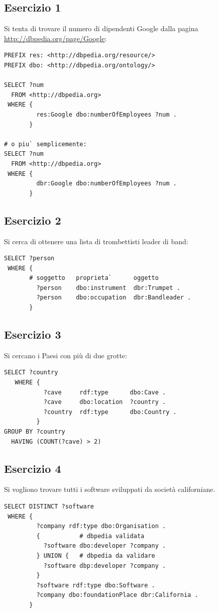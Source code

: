 \documentclass[11pt]{article}
\begin{document}
\subsection*{Esercizio 1}
Si tenta di trovare il numero di dipendenti Google dalla pagina \url{http://dbpedia.org/page/Google}:
\begin{lstlisting}[language=sparql]
PREFIX res: <http://dbpedia.org/resource/>
PREFIX dbo: <http://dbpedia.org/ontology/>

SELECT ?num
  FROM <http://dbpedia.org>
 WHERE {
         res:Google dbo:numberOfEmployees ?num .
       }

# o piu` semplicemente:
SELECT ?num
  FROM <http://dbpedia.org>
 WHERE {
         dbr:Google dbo:numberOfEmployees ?num .
       }
\end{lstlisting}

\subsection*{Esercizio 2}
Si cerca di ottenere una lista di trombettisti leader di band:
\begin{lstlisting}[language=sparql]
SELECT ?person
 WHERE {
       # soggetto   proprieta`      oggetto
         ?person    dbo:instrument  dbr:Trumpet .
         ?person    dbo:occupation  dbr:Bandleader .
       }
\end{lstlisting}

\subsection*{Esercizio 3}
Si cercano i Paesi con più di due grotte:
\begin{lstlisting}[language=sparql]
  SELECT ?country
   WHERE {
           ?cave     rdf:type      dbo:Cave .
           ?cave     dbo:location  ?country .
           ?country  rdf:type      dbo:Country .
         }
GROUP BY ?country
  HAVING (COUNT(?cave) > 2)
\end{lstlisting}

\subsection*{Esercizio 4}
Si vogliono trovare tutti i software sviluppati da società californiane.
\begin{lstlisting}[language=sparql]
SELECT DISTINCT ?software
 WHERE {
         ?company rdf:type dbo:Organisation .
         {           # dbpedia validata
           ?software dbo:developer ?company .
         } UNION {   # dbpedia da validare
           ?software dbp:developer ?company .
         }
         ?software rdf:type dbo:Software .
         ?company dbo:foundationPlace dbr:California .
       }
\end{lstlisting}
\end{document}
